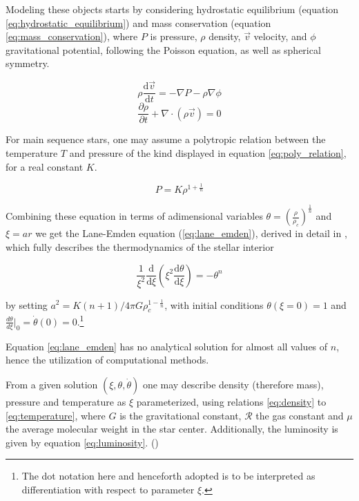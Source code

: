 \documentclass{aa}
\begin{document}
Modeling these objects starts by considering hydrostatic equilibrium (equation
\ref{eq:hydrostatic_equilibrium}) and mass conservation (equation
\ref{eq:mass_conservation}), where $P$ is pressure, $\rho$ density, $\vec{v}$ velocity, and $\phi$
gravitational potential, following the Poisson equation, as well as spherical symmetry.

\begin{equation}
  \label{eq:hydrostatic_equilibrium}
  \rho \frac{\mathrm{d} \vec{v}}{\mathrm{d} t}=-\nabla P-\rho \nabla \phi
\end{equation}
\begin{equation}
  \label{eq:mass_conservation}
  \frac{\partial \rho}{\partial t}+\nabla \cdot(\rho \vec{v})=0
\end{equation}

For main sequence stars, one may assume a polytropic relation between the
temperature $T$ and pressure of the kind displayed in equation
\ref{eq:poly_relation}, for a real constant $K$.

\begin{equation}
  \label{eq:poly_relation}
  P=K \rho^{1+\frac{1}{n}}
\end{equation}

Combining these equation in terms of adimensional variables $\theta = \left(
  \frac{\rho}{\rho_c} \right)^\frac{1}{n}$ and $\xi = a r$ we get the Lane-Emden
equation (\ref{eq:lane_emden}), derived in detail in
\cite{monteiro_sebenta_2019}, which fully describes the thermodynamics of the
stellar interior

\begin{equation}
  \label{eq:lane_emden}
  \frac{1}{\xi^{2}} \frac{\mathrm{d}}{\mathrm{d} \xi}\left(\xi^{2} \frac{\mathrm{d} \theta}{\mathrm{d} \xi}\right)=-\theta^{n}
\end{equation}

by setting $a^{2}= K(n+1) / 4 \pi G \rho_{c}^{1-\frac{1}{n}}$, with initial
conditions $\theta (\xi = 0) =  1$ and $\frac{d \theta}{d \xi} \big|_{0}=
\dot{\theta}(0) = 0$.\footnote{The dot notation here and henceforth adopted is
  to be interpreted as differentiation with respect to parameter $\xi$.}

Equation \ref{eq:lane_emden} has no analytical solution for almost all values of $n$, hence the
utilization of computational methods.

From a given solution $\left( \xi, \theta, \dot{\theta} \right)$ one may
describe density (therefore mass), pressure and temperature as $\xi$
parameterized, using relations \ref{eq:density} to \ref{eq:temperature}, where
$G$ is the gravitational constant, $\mathscr{R}$ the gas constant and $\mu$ the
average molecular weight in the star center. Additionally, the luminosity is given by equation
\ref{eq:luminosity}. (\cite{monteiro_sebenta_2019})
\end{document}
